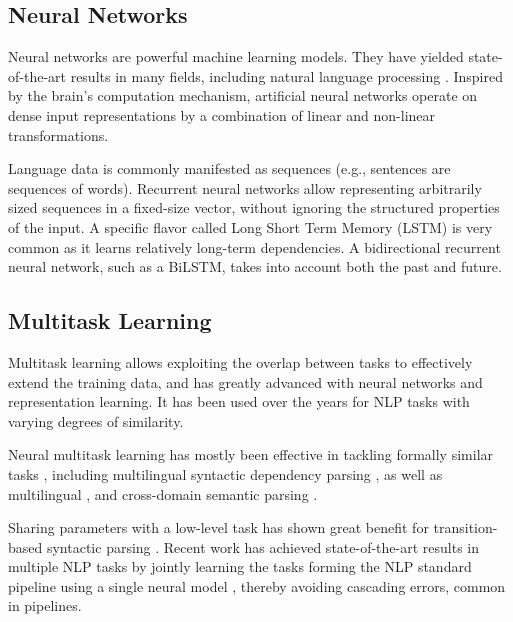 \documentclass[12pt]{article}
\begin{document}
\subsection{Neural Networks}\label{sec:neural_networks}

Neural networks are powerful machine learning models.
They have yielded state-of-the-art results in many fields,
including natural language processing \cite{goldberg2016primer}.
Inspired by the brain's computation mechanism,
artificial neural networks operate on dense input representations
by a combination of linear and non-linear transformations.

Language data is commonly manifested as sequences
(e.g., sentences are sequences of words).
Recurrent neural networks \cite{elman1990finding} allow representing
arbitrarily sized sequences in a fixed-size vector,
without ignoring the structured properties of the input.
A specific flavor called Long Short Term Memory
(LSTM) is very common as it learns relatively long-term dependencies.
A bidirectional recurrent neural network, such as a BiLSTM,
takes into account both the past and future.


\subsection{Multitask Learning}\label{sec:multitask}

Multitask learning \cite{caruana1998multitask} allows exploiting the overlap between tasks
to effectively extend the training data, 
and has greatly advanced with neural networks and representation learning.
It has been used over the years for NLP tasks with varying degrees of similarity.

Neural multitask learning has mostly been effective in tackling formally similar
tasks \cite{P16-2038},
including
multilingual syntactic dependency parsing \cite{Q16-1031,guo2016exploiting},
as well as multilingual \cite{duong2017multilingual},
and cross-domain semantic parsing \cite{herzig-berant:2017:Short,W17-2607}.

Sharing parameters with a low-level task
has shown great benefit for transition-based syntactic parsing
\cite{bohnet2012transition,Zhang2016StackpropagationIR,constant-nivre:2016:P16-1,more2016joint}.
Recent work has achieved state-of-the-art results in multiple NLP tasks
by jointly learning the tasks forming the NLP standard pipeline using 
a single neural model \cite{collobert2011natural,D17-1206},
thereby avoiding cascading errors, common in pipelines.
\end{document}

